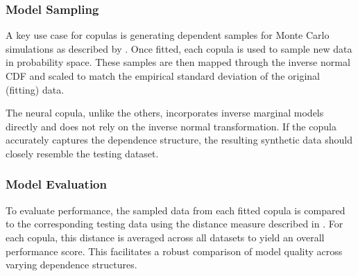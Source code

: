 \subsubsection{Model Sampling}
A key use case for copulas is generating dependent samples for Monte Carlo simulations as described by \citet[p.~40]{Nelsen2006}. Once fitted, each copula is used to sample new data in probability space. These samples are then mapped through the inverse normal CDF and scaled to match the empirical standard deviation of the original (fitting) data.

The neural copula, unlike the others, incorporates inverse marginal models directly and does not rely on the inverse normal transformation. If the copula accurately captures the dependence structure, the resulting synthetic data should closely resemble the testing dataset.

\subsubsection{Model Evaluation}
To evaluate performance, the sampled data from each fitted copula is compared to the corresponding testing data using the distance measure described in . For each copula, this distance is averaged across all datasets to yield an overall performance score. This facilitates a robust comparison of model quality across varying dependence structures.


